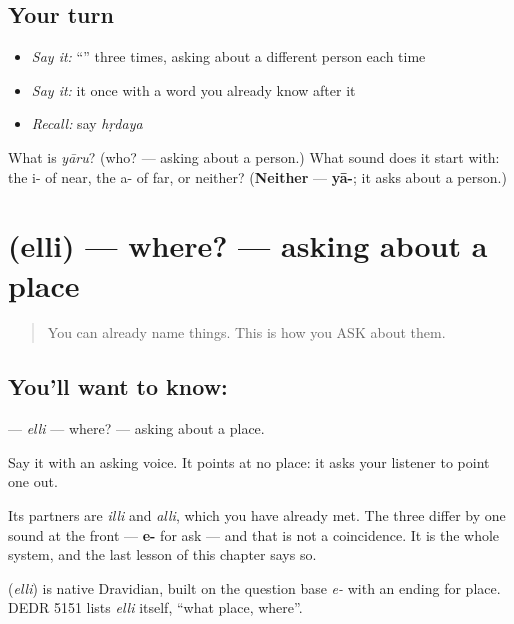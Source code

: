 \subsection*{Your turn}
\begin{itemize}
\raggedright
  \item \emph{Say it:} \textquotedblleft{}\textquotedblright{} three times, asking about a different person each time
  \item \emph{Say it:} it once with a word you already know after it
  \item \emph{Recall:} say \emph{hṛdaya}
\end{itemize}

\begin{tcolorbox}[breakable,colback=teal!4,colframe=teal!35!black,title={Before you move on}]
What is \emph{yāru}? (who? — asking about a person.) What sound does it start with: the i- of near, the a- of far, or neither? (\textbf{Neither} — \textbf{yā-}; it asks about a person.)
\end{tcolorbox}
\section[\texorpdfstring{\kn{ಎಲ್ಲಿ} (elli)}{ಎಲ್ಲಿ (elli)}]{ (elli) — where? — asking about a place}

\label{lesson:KA-C41-where}



\begin{quote}
You can already name things. This is how you ASK about them.
\end{quote}

\subsection*{You'll want to know: }
\textbf{} — \emph{elli} — where? — asking about a place.

Say it with an asking voice. It points at no place: it asks your listener to point one out.

Its partners are \textbf{} \emph{illi} and \textbf{} \emph{alli}, which you have already met. The three differ by one sound at the front — \textbf{e-} for ask — and that is not a coincidence. It is the whole system, and the last lesson of this chapter says so.

\begin{cousinweb}
\textbf{} (\emph{elli}) is native Dravidian, built on the question base \emph{e-} with an ending for place. DEDR 5151 lists \emph{elli} itself, \textquotedblleft{}what place, where\textquotedblright{}.
\end{cousinweb}

